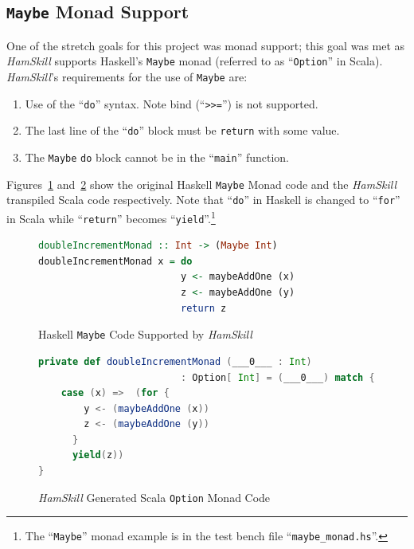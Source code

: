 \documentclass{report}
\begin{document}
\subsection{\texttt{Maybe} Monad Support}

One of the stretch goals for this project was monad support; this goal was met as \textit{HamSkill} supports Haskell's \texttt{Maybe} monad (referred to as ``\texttt{Option}'' in Scala).  \textit{HamSkill}'s requirements for the use of \texttt{Maybe} are:

\begin{enumerate}

\item Use of the ``\texttt{do}'' syntax.  Note bind (``\texttt{>>=}'') is not supported.

\item The last line of the ``\texttt{do}'' block must be \texttt{return} with some value.

\item The \texttt{Maybe} \texttt{do} block cannot be in the ``\texttt{main}'' function.

\end{enumerate}

Figures~\ref{fig:haskellMaybeMonad} and~\ref{fig:haskellOptionMonad} show the original Haskell \texttt{Maybe} Monad code and the \textit{HamSkill} transpiled Scala code respectively.  Note that ``\texttt{do}'' in Haskell is changed to ``\texttt{for}'' in Scala while ``\texttt{return}'' becomes ``\texttt{yield}''.\footnote{The ``\texttt{Maybe}'' monad example is in the test bench file ``\texttt{maybe\_monad.hs}''.}

\begin{figure}[H]
\begin{mdframed}
\begin{lstlisting}[language=Haskell]
doubleIncrementMonad :: Int -> (Maybe Int)
doubleIncrementMonad x = do
                         y <- maybeAddOne (x)
                         z <- maybeAddOne (y)
                         return z
\end{lstlisting}
\end{mdframed}
\caption{Haskell \texttt{Maybe} Code Supported by \textit{HamSkill}}
\label{fig:haskellMaybeMonad}
\end{figure}

\begin{figure}[H]
\begin{mdframed}
\begin{lstlisting}[language=Scala, basicstyle=\small]
private def doubleIncrementMonad (___0___ : Int) 
                         : Option[ Int] = (___0___) match {
    case (x) =>  (for {
        y <- (maybeAddOne (x))
        z <- (maybeAddOne (y))
      }
      yield(z))
}
\end{lstlisting}
\end{mdframed}
\caption{\textit{HamSkill} Generated Scala \texttt{Option} Monad Code}
\label{fig:haskellOptionMonad}
\end{figure}
\end{document}
